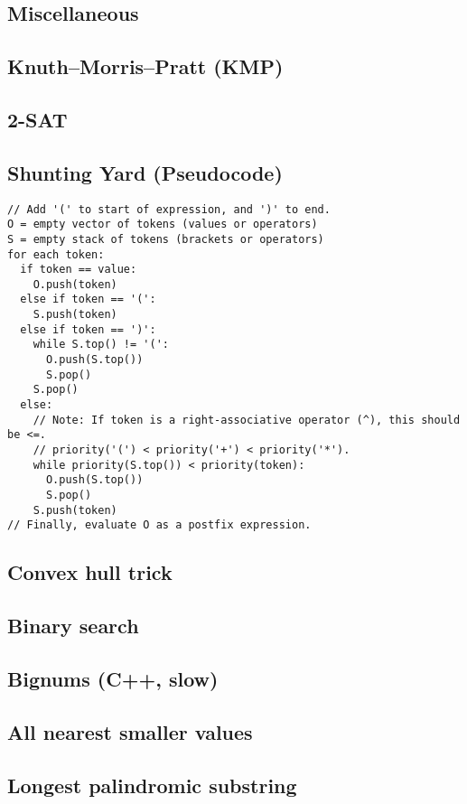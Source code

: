 \documentclass[10pt]{extarticle}
\begin{document}
\begin{multicols*}{3}
\section{Miscellaneous}

\subsection{Knuth--Morris--Pratt (KMP)} %


\subsection{2-SAT} %


\subsection{Shunting Yard (Pseudocode)} %
\begin{lstlisting}
// Add '(' to start of expression, and ')' to end.
O = empty vector of tokens (values or operators)
S = empty stack of tokens (brackets or operators)
for each token:
  if token == value:
    O.push(token)
  else if token == '(':
    S.push(token)
  else if token == ')':
    while S.top() != '(':
      O.push(S.top())
      S.pop()
    S.pop()
  else:
    // Note: If token is a right-associative operator (^), this should be <=.
	// priority('(') < priority('+') < priority('*').
    while priority(S.top()) < priority(token):
      O.push(S.top())
      S.pop()
    S.push(token)
// Finally, evaluate O as a postfix expression.
\end{lstlisting}

\subsection{Convex hull trick} %


\subsection{Binary search} %


\subsection{Bignums (C++, slow)} %


\subsection{All nearest smaller values} %


\subsection{Longest palindromic substring} %

\end{multicols*}
\end{document}
